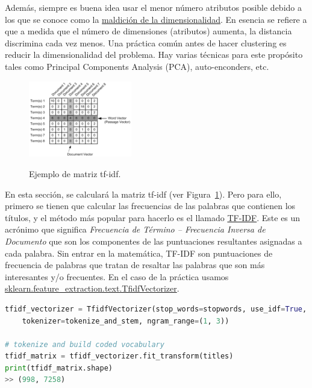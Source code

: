 \documentclass{uimppracticas}
\begin{document}
Además, siempre es buena idea usar el menor número atributos posible debido a los que se conoce como la \href{https://www.iartificial.net/la-maldicion-de-la-dimension-en-machine-learning/}{maldición de la dimensionalidad}. En esencia se refiere a que a medida que el número de dimensiones (atributos) aumenta, la distancia discrimina cada vez menos. Una práctica común antes de hacer clustering es reducir la dimensionalidad del problema. Hay varias técnicas para este propósito tales como Principal Components Analysis (PCA), auto-enconders, etc.



\begin{figure}
	\centering
	\caption{Ejemplo de matriz tf-idf.}
	\includegraphics[width=0.4\textwidth]{images/matrix}
	\label{matrix}
\end{figure}

En esta sección, se calculará la matriz tf-idf (ver Figura~\ref{matrix}). Pero para ello, primero se tienen que calcular las frecuencias de las palabras que contienen los títulos, y el método más popular para hacerlo es el llamado \href{https://es.wikipedia.org/wiki/Tf-idf}{TF-IDF}. Este es un acrónimo que significa \textit{Frecuencia de Término – Frecuencia Inversa de Documento} que son los componentes de las puntuaciones resultantes asignadas a cada palabra. Sin entrar en la matemática, TF-IDF son puntuaciones de frecuencia de palabras que tratan de resaltar las palabras que son más interesantes y/o frecuentes. En el caso de la práctica usamos \href{https://scikit-learn.org/stable/modules/generated/sklearn.feature_extraction.text.TfidfVectorizer.html}{sklearn.feature\_extraction.text.TfidfVectorizer}.

\newpage 

\begin{lstlisting}[language=python]
tfidf_vectorizer = TfidfVectorizer(stop_words=stopwords, use_idf=True, 
	tokenizer=tokenize_and_stem, ngram_range=(1, 3))
									
# tokenize and build coded vocabulary
tfidf_matrix = tfidf_vectorizer.fit_transform(titles)
print(tfidf_matrix.shape)
>> (998, 7258)
\end{lstlisting}
\end{document}
